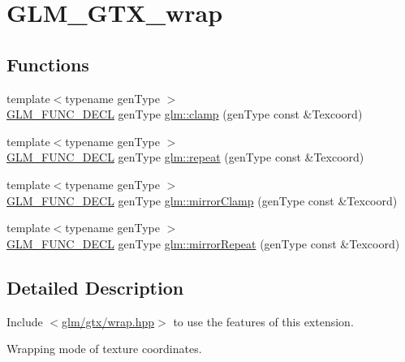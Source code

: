 \hypertarget{group__gtx__wrap}{}\section{G\+L\+M\+\_\+\+G\+T\+X\+\_\+wrap}
\label{group__gtx__wrap}
\subsection*{Functions}
\begin{DoxyCompactItemize}
\item 
{\footnotesize template$<$typename gen\+Type $>$ }\\\mbox{\hyperlink{setup_8hpp_ab2d052de21a70539923e9bcbf6e83a51}{G\+L\+M\+\_\+\+F\+U\+N\+C\+\_\+\+D\+E\+CL}} gen\+Type \mbox{\hyperlink{group__gtx__wrap_ga6c0cc6bd1d67ea1008d2592e998bad33}{glm\+::clamp}} (gen\+Type const \&Texcoord)
\item 
{\footnotesize template$<$typename gen\+Type $>$ }\\\mbox{\hyperlink{setup_8hpp_ab2d052de21a70539923e9bcbf6e83a51}{G\+L\+M\+\_\+\+F\+U\+N\+C\+\_\+\+D\+E\+CL}} gen\+Type \mbox{\hyperlink{group__gtx__wrap_ga809650c6310ea7c42666e918c117fb6f}{glm\+::repeat}} (gen\+Type const \&Texcoord)
\item 
{\footnotesize template$<$typename gen\+Type $>$ }\\\mbox{\hyperlink{setup_8hpp_ab2d052de21a70539923e9bcbf6e83a51}{G\+L\+M\+\_\+\+F\+U\+N\+C\+\_\+\+D\+E\+CL}} gen\+Type \mbox{\hyperlink{group__gtx__wrap_gaa6856a0a048d2749252848da35e10c8b}{glm\+::mirror\+Clamp}} (gen\+Type const \&Texcoord)
\item 
{\footnotesize template$<$typename gen\+Type $>$ }\\\mbox{\hyperlink{setup_8hpp_ab2d052de21a70539923e9bcbf6e83a51}{G\+L\+M\+\_\+\+F\+U\+N\+C\+\_\+\+D\+E\+CL}} gen\+Type \mbox{\hyperlink{group__gtx__wrap_ga16a89b0661b60d5bea85137bbae74d73}{glm\+::mirror\+Repeat}} (gen\+Type const \&Texcoord)
\end{DoxyCompactItemize}


\subsection{Detailed Description}
Include $<$\mbox{\hyperlink{wrap_8hpp}{glm/gtx/wrap.\+hpp}}$>$ to use the features of this extension.

Wrapping mode of texture coordinates. 

